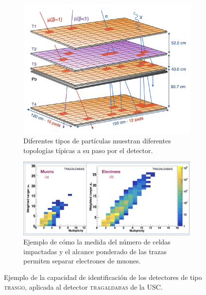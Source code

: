 \documentclass[a4paper]{article}
\begin{document}


\begin{figure}[h] 
  \centering
  \begin{subfigure}[c]{0.45\linewidth}
    \centering
    \includegraphics[width=\linewidth]{tragas_3d.png} 
    \caption{Diferentes tipos de partículas muestran diferentes topologías típicas a su paso por el detector.}
    \label{fg:intro1-a} 
  \end{subfigure} 
  \hspace{0.2cm}
  \begin{subfigure}[c]{0.50\linewidth}
    \centering
    \includegraphics[width=\linewidth]{b_midasp.jpeg} 
    \caption{Ejemplo de cómo la medida del número de celdas impactadas y el alcance ponderado de las trazas permiten separar electrones de muones.} 
    \label{fg:intro1-b} 
  \end{subfigure}%
  \caption{Ejemplo de la capacidad de identificación de los detectores de tipo \textsc{trasgo}, aplicada al detector  \textsc{tragaldabas} de la USC.}
  \label{fg:intro1} 
\end{figure}
\end{document}
